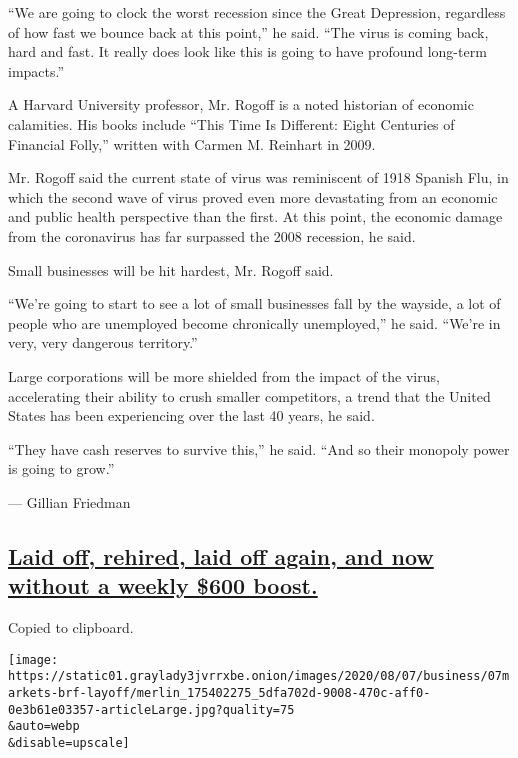 ``We are going to clock the worst recession since the Great Depression,
regardless of how fast we bounce back at this point,'' he said. ``The
virus is coming back, hard and fast. It really does look like this is
going to have profound long-term impacts.''

A Harvard University professor, Mr. Rogoff is a noted historian of
economic calamities. His books include ``This Time Is Different: Eight
Centuries of Financial Folly,'' written with Carmen M. Reinhart in 2009.

Mr. Rogoff said the current state of virus was reminiscent of 1918
Spanish Flu, in which the second wave of virus proved even more
devastating from an economic and public health perspective than the
first. At this point, the economic damage from the coronavirus has far
surpassed the 2008 recession, he said.

Small businesses will be hit hardest, Mr. Rogoff said.

``We're going to start to see a lot of small businesses fall by the
wayside, a lot of people who are unemployed become chronically
unemployed,'' he said. ``We're in very, very dangerous territory.''

Large corporations will be more shielded from the impact of the virus,
accelerating their ability to crush smaller competitors, a trend that
the United States has been experiencing over the last 40 years, he said.

``They have cash reserves to survive this,'' he said. ``And so their
monopoly power is going to grow.''

--- Gillian Friedman

\hypertarget{laid-off-rehired-laid-off-again-and-now-without-a-weekly-600-boost}{%
\subsection{\texorpdfstring{\protect\hyperlink{laid-off-rehired-laid-off-again-and-now-without-a-weekly-600-boost}{Laid
off, rehired, laid off again, and now without a weekly \$600
boost.}}{Laid off, rehired, laid off again, and now without a weekly \$600 boost.}}\label{laid-off-rehired-laid-off-again-and-now-without-a-weekly-600-boost}}

Copied to clipboard.

\texttt{[image: https://static01.graylady3jvrrxbe.onion/images/2020/08/07/business/07markets-brf-layoff/merlin\_175402275\_5dfa702d-9008-470c-aff0-0e3b61e03357-articleLarge.jpg?quality=75\\\&auto=webp\\\&disable=upscale]}


